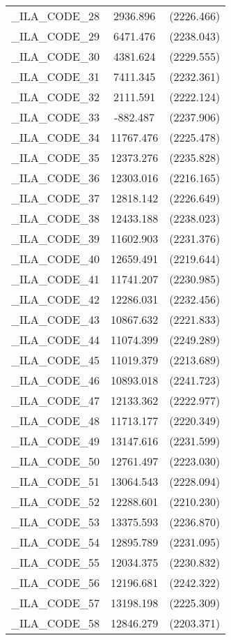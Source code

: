 {\begin{table}[htbp]
\begin{tabular}{l c c }
\_ILA\_CODE\_28  &  2936.896  & (2226.466)\\
\_ILA\_CODE\_29  &  6471.476  & (2238.043)\\
\_ILA\_CODE\_30  &  4381.624  & (2229.555)\\
\_ILA\_CODE\_31  &  7411.345  & (2232.361)\\
\_ILA\_CODE\_32  &  2111.591  & (2222.124)\\
\_ILA\_CODE\_33  &  -882.487  & (2237.906)\\
\_ILA\_CODE\_34  &  11767.476  & (2225.478)\\
\_ILA\_CODE\_35  &  12373.276  & (2235.828)\\
\_ILA\_CODE\_36  &  12303.016  & (2216.165)\\
\_ILA\_CODE\_37  &  12818.142  & (2226.649)\\
\_ILA\_CODE\_38  &  12433.188  & (2238.023)\\
\_ILA\_CODE\_39  &  11602.903  & (2231.376)\\
\_ILA\_CODE\_40  &  12659.491  & (2219.644)\\
\_ILA\_CODE\_41  &  11741.207  & (2230.985)\\
\_ILA\_CODE\_42  &  12286.031  & (2232.456)\\
\_ILA\_CODE\_43  &  10867.632  & (2221.833)\\
\_ILA\_CODE\_44  &  11074.399  & (2249.289)\\
\_ILA\_CODE\_45  &  11019.379  & (2213.689)\\
\_ILA\_CODE\_46  &  10893.018  & (2241.723)\\
\_ILA\_CODE\_47  &  12133.362  & (2222.977)\\
\_ILA\_CODE\_48  &  11713.177  & (2220.349)\\
\_ILA\_CODE\_49  &  13147.616  & (2231.599)\\
\_ILA\_CODE\_50  &  12761.497  & (2223.030)\\
\_ILA\_CODE\_51  &  13064.543  & (2228.094)\\
\_ILA\_CODE\_52  &  12288.601  & (2210.230)\\
\_ILA\_CODE\_53  &  13375.593  & (2236.870)\\
\_ILA\_CODE\_54  &  12895.789  & (2231.095)\\
\_ILA\_CODE\_55  &  12034.375  & (2230.832)\\
\_ILA\_CODE\_56  &  12196.681  & (2242.322)\\
\_ILA\_CODE\_57  &  13198.198  & (2225.309)\\
\_ILA\_CODE\_58  &  12846.279  & (2203.371)\\

\end{tabular}
\end{table}}
